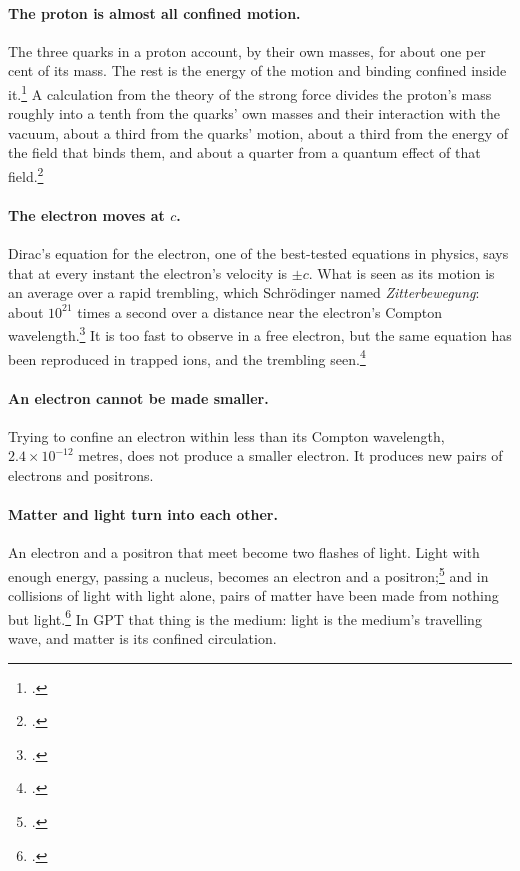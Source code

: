 \documentclass[11pt,a4paper]{article}
\newcommand{\fn}[1]{\footnote{\citealp{#1}.}}
\begin{document}
\paragraph{The proton is almost all confined motion.} The three quarks in a proton account, by their own masses, for about one per cent of its mass. The rest is the energy of the motion and binding confined inside it.\fn{yang2018} A calculation from the theory of the strong force divides the proton's mass roughly into a tenth from the quarks' own masses and their interaction with the vacuum, about a third from the quarks' motion, about a third from the energy of the field that binds them, and about a quarter from a quantum effect of that field.\fn{yang2018} 

\paragraph{The electron moves at $c$.} Dirac's equation for the electron, one of the best-tested equations in physics, says that at every instant the electron's velocity is $\pm c$. What is seen as its motion is an average over a rapid trembling, which Schr\"odinger named \emph{Zitterbewegung}: about $10^{21}$ times a second over a distance near the electron's Compton wavelength.\fn{schrodinger1930} It is too fast to observe in a free electron, but the same equation has been reproduced in trapped ions, and the trembling seen.\fn{gerritsma2010}

\paragraph{An electron cannot be made smaller.} Trying to confine an electron within less than its Compton wavelength, $2.4\times10^{-12}$ metres, does not produce a smaller electron. It produces new pairs of electrons and positrons.

\paragraph{Matter and light turn into each other.} An electron and a positron that meet become two flashes of light. Light with enough energy, passing a nucleus, becomes an electron and a positron;\fn{anderson1933} and in collisions of light with light alone, pairs of matter have been made from nothing but light.\fn{star2021}  In GPT that thing is the medium: light is the medium's travelling wave, and matter is its confined circulation.
\end{document}
